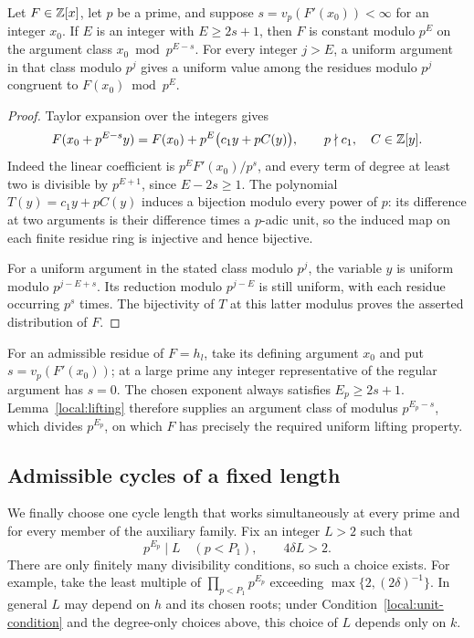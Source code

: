 \begin{lemma}\label{local:lifting}
Let \(F\in\mathbb Z[x]\), let \(p\) be a prime, and suppose
\(s=v_p(F'(x_0))<\infty\) for an integer \(x_0\). If \(E\) is an integer
with \(E\ge2s+1\), then
\(F\) is constant modulo \(p^E\) on the argument class
\(x_0\bmod p^{E-s}\). For every integer \(j>E\), a uniform argument in
that class modulo \(p^j\) gives a uniform value among the residues modulo
\(p^j\) congruent to \(F(x_0)\bmod p^E\).
\end{lemma}

\begin{proof}
Taylor expansion over the integers gives
\[
 F(x_0+p^{E-s}y)=F(x_0)+p^E\bigl(c_1y+pC(y)\bigr),
 \qquad p\nmid c_1,\quad C\in\mathbb Z[y].
\]
Indeed the linear coefficient is \(p^EF'(x_0)/p^s\), and every term of
degree at least two is divisible by \(p^{E+1}\), since \(E-2s\ge1\).
The polynomial \(T(y)=c_1y+pC(y)\) induces a bijection modulo every power
of \(p\): its difference at two arguments is their difference times a
\(p\)-adic unit, so the induced map on each finite residue ring is
injective and hence bijective.

For a uniform argument in the stated class modulo \(p^j\), the variable
\(y\) is uniform modulo \(p^{j-E+s}\). Its reduction modulo
\(p^{j-E}\) is still uniform, with each residue occurring \(p^s\) times.
The bijectivity of \(T\) at this latter modulus proves the asserted
distribution of \(F\).
\end{proof}

For an admissible residue of \(F=h_l\), take its defining argument \(x_0\)
and put \(s=v_p(F'(x_0))\); at a large prime any integer representative of
the regular argument has \(s=0\). The chosen exponent always satisfies
\(E_p\ge2s+1\). Lemma~\ref{local:lifting} therefore supplies an argument
class of modulus \(p^{E_p-s}\), which divides \(p^{E_p}\), on which
\(F\) has precisely the required uniform lifting property.

\subsection{Admissible cycles of a fixed length}

We finally choose one cycle length that works simultaneously at every prime
and for every member of the auxiliary family. Fix an integer \(L>2\) such
that
\[
 p^{E_p}\mid L\quad(p<P_1),
 \qquad 4\delta L>2.
\]
There are only finitely many divisibility conditions, so such a choice exists.
For example, take the least multiple of \(\prod_{p<P_1}p^{E_p}\) exceeding
\(\max\{2,(2\delta)^{-1}\}\). In general \(L\) may depend on \(h\) and its
chosen roots; under
Condition~\eqref{local:unit-condition} and the degree-only choices above,
this choice of \(L\) depends only on \(k\).

